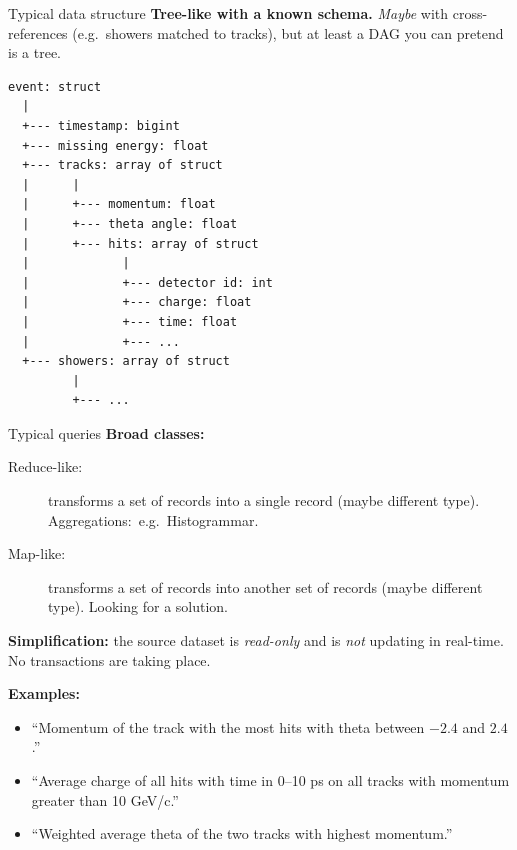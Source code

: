 \documentclass{beamer}
\begin{document}
\begin{frame}[fragile]{Typical data structure}
\vspace{0.25 cm}
\small
{\bf Tree-like with a known schema.} {\it Maybe} with cross-references (e.g.\ showers matched to tracks), but at least a DAG you can pretend is a tree.
\begin{verbatim}
event: struct
  |
  +--- timestamp: bigint
  +--- missing energy: float
  +--- tracks: array of struct
  |      |
  |      +--- momentum: float
  |      +--- theta angle: float
  |      +--- hits: array of struct
  |             |
  |             +--- detector id: int
  |             +--- charge: float
  |             +--- time: float
  |             +--- ...
  +--- showers: array of struct
         |
         +--- ...
\end{verbatim}
\end{frame}

\begin{frame}{Typical queries}
\vspace{0.25 cm}
{\bf Broad classes:}
\begin{description}
\item[Reduce-like:] transforms a set of records into a single record (maybe different type). \mbox{Aggregations: e.g.\ Histogrammar.\hspace{-1 cm}}
\item[Map-like:] transforms a set of records into another set of records (maybe different type). Looking for a solution.
\end{description}

\vspace{0.25 cm}
{\bf Simplification:} the source dataset is {\it read-only} and is {\it not} updating in real-time. No transactions are taking place.

\vspace{0.25 cm}
{\bf Examples:}
\begin{itemize}
\item ``Momentum of the track with the most hits with theta between $-2.4$ and $2.4$.''
\item ``Average charge of all hits with time in 0--10 ps on all tracks with momentum greater than 10 GeV/c.''
\item ``Weighted average theta of the two tracks with highest momentum.''
\end{itemize}
\end{frame}
\end{document}

